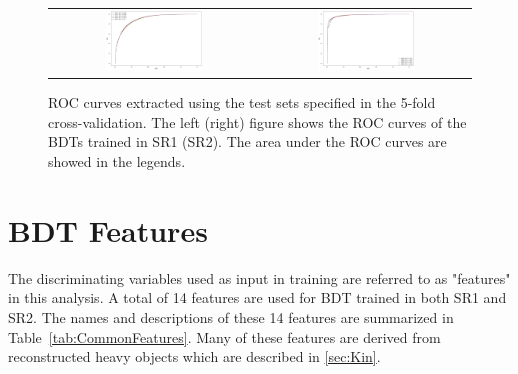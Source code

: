 \begin{figure}[tbh!]
 \begin{center}
 \begin{tabular}{cc}
 \includegraphics[width=0.48\textwidth]{figures/Part3/BDT/5foldTT}&
  \includegraphics[width=0.48\textwidth]{figures/Part3/BDT/5foldST}\\
 \end{tabular}
 \caption{\ac{ROC} curves extracted using the test sets specified in the 5-fold cross-validation. The left (right) figure shows the \ac{ROC} curves of the \acp{BDT} trained in \ac{SR}1 (\ac{SR}2). The area under the \ac{ROC} curves are showed in the legends.}
 \label{fig:ROC}
 \end{center}
\end{figure}

\section{BDT Features}
\label{sec:Input}

The discriminating variables used as input in training are referred to as "features" in this analysis. A total of 14 features are used for \ac{BDT} trained in both \ac{SR}1 and \ac{SR}2. The names and descriptions of these 14 features are summarized in Table~\ref{tab:CommonFeatures}. Many of these features are derived from reconstructed heavy objects which are described in \autoref{sec:Kin}.


